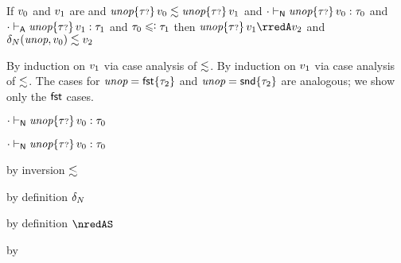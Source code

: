 \begin{lemma}\label{HA-S-unop}
  If\/ $v_0$ and\/ $v_1$ are \reducedsurfaceexpressions{}
  and\/ $\textit{unop}{\{{\tau{\scriptstyle ?}}\}}\,v_0 \lesssim \textit{unop}{\{{\tau{\scriptstyle ?}}\}}\,v_1$
  and\/ ${\cdot} \vdash_{\mathsf{N}} {\textit{unop}{\{{\tau{\scriptstyle ?}}\}}\,v_0} : \tau_0$
  and\/ ${\cdot} \vdash_{\mathsf{A}} {\textit{unop}{\{{\tau{\scriptstyle ?}}\}}\,v_1} : \tau_1$
  and\/ $\stype_0 \subteq \stype_1$
  then\/ $\eunopt{\stoptional}{\svalue_1} \rredA \svalue_2$
  and\/ $\delta_{N}(\textit{unop}, v_0) \lesssim v_2$
\end{lemma}{
  \newcommand{\shortpf}{By induction on $\svalue_1$ via case analysis of $\srexpr$.}
\begin{lamportproof*}
  \shortpf
\mainproof
  \shortpf
  The cases for $\textit{unop} = \mathsf{fst}{\{\tau_2\}}$ and $\textit{unop} = \mathsf{snd}{\{\tau_2\}}$  are analogous; we show only the $\mathsf{fst}$ cases.

    \begin{pfproof}
      \absurdstep
        \begin{pfproof}
          ${\cdot} \vdash_{\mathsf{N}} \textit{unop}{\{{\tau{\scriptstyle ?}}\}}\,v_0 : \tau_0$
        \end{pfproof}
    \end{pfproof}

    \begin{pfproof}
      \absurdstep
        \begin{pfproof}
          ${\cdot} \vdash_{\mathsf{N}} \textit{unop}{\{{\tau{\scriptstyle ?}}\}}\,v_0 : \tau_0$
        \end{pfproof}
    \end{pfproof}

    \begin{pfproof}
        \begin{pfproof}
          by inversion $\lesssim$
        \end{pfproof}
        \begin{pfproof}
          by definition $\delta_{N}$
        \end{pfproof}
        \begin{pfproof}
          by definition $\nredAS$
        \end{pfproof}
      \qedstep
        \begin{pfproof}
          by 
        \end{pfproof}
    \end{pfproof}


\end{lamportproof*}}
